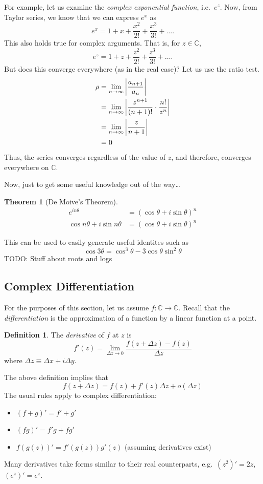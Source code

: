 \documentclass[10pt]{scrartcl}
\numberwithin{equation}{subsection}
\theoremstyle{definition}
\newtheorem{definition}{Definition}[section]
\newtheorem{theorem}{Theorem}[section]
\theoremstyle{remark}
\newenvironment{definitionSR}
	{
		\begin{siderules}
			\begin{definition}
			}
			{
			\end{definition}
		\end{siderules}
	}
\newenvironment{theoremSR}
	{
		\begin{siderules}
			\begin{theorem}
			}
			{
			\end{theorem}
		\end{siderules}
	}
\newcommand{\Complex}{\mathbb{C}}
\begin{document}
For example, let us examine the \textit{complex exponential function}, i.e.\
$e^z$. Now, from Taylor series, we know that we can express $e^x$ as
\[
	e^x = 1 + x + \frac{x^2}{2!} + \frac{x^3}{3!} + \ldots.
\]
This also holds true for complex arguments. That is, for $z \in \Complex$,
\begin{equation}
	e^z = 1 + z + \frac{z^2}{2!} + \frac{z^3}{3!} + \ldots.
\end{equation}
But does this converge everywhere (as in the real case)? Let us use the ratio
test.
\begin{align*}
	\rho &= \lim_{n \to \infty} \abs{\frac{a_{n+1}}{a_n}} \\
      &= \lim_{n \to \infty} \abs{\frac{z^{n+1}}{(n+1)!} \cdot \frac{n!}{z^n}} \\
      &= \lim_{n \to \infty} \abs{\frac{z}{n+1}} \\
      &= 0
\end{align*}
Thus, the series converges regardless of the value of $z$, 
and therefore, converges everywhere on $\Complex$.

Now, just to get some useful knowledge out of the way\ldots
\begin{theoremSR}[De Moive's Theorem]
	\begin{align*}
		e^{in\theta} &= (\cos{\theta} + i \sin{\theta})^n \\
		\cos{n\theta} + i \sin{n\theta} &= (\cos{\theta} + i \sin{\theta})^n
	\end{align*}
\end{theoremSR}
This can be used to easily generate useful identites such as 
\[
	\cos{3\theta} = \cos^3{\theta} - 3\cos{\theta}\sin^2{\theta}
\]
TODO: Stuff about roots and logs
\subsection{Complex Differentiation}
For the purposes of this section, let us assume $f : \Complex \to \Complex$.
Recall that the \textit{differentiation} is the approximation of a function by a
linear function at a point.
\begin{definitionSR}
	The \textit{derivative} of $f$ at $z$ is
	\begin{equation*}
		f'(z) = \lim_{\Delta z \to 0} \frac{f(z + \Delta z) -
		f(z)}{\Delta z}
	\end{equation*}
	where $\Delta z \equiv \Delta x + i \Delta y$.
\end{definitionSR}
The above definition implies that
\begin{equation}
	f(z + \Delta z) = f(z) + f'(z) \Delta z + o(\Delta z)
\end{equation}
The usual rules apply to complex differentiation:
\begin{itemize}
	\item $(f + g)' = f' + g'$
	\item $(fg)' = f'g + fg'$ 
	\item $f(g(z))' = f'(g(z))g'(z)$ (assuming derivatives exist)
\end{itemize}
Many derivatives take forms similar to their real counterparts, e.g.\ $(z^2)' =
2z$, $(e^z)' = e^z$. 
\end{document}

